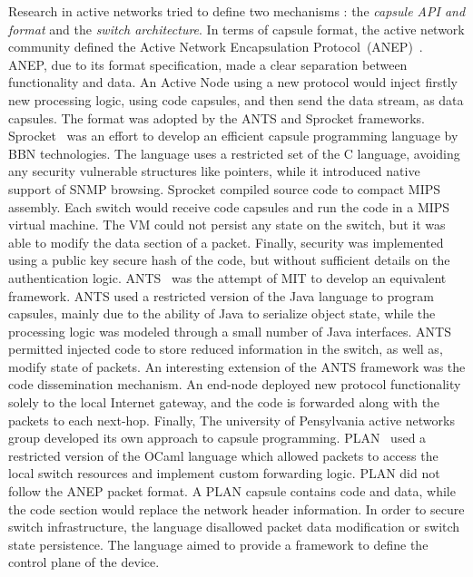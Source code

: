 Research in active networks tried to define two mechanisms : the {\it capsule
  API and format} and the {\it switch architecture}. In terms of capsule
format, the active network community defined the Active Network Encapsulation
Protocol~(ANEP)~\cite{alexander1997a}.  ANEP, due to its format specification,
made a clear separation between functionality and data. An Active Node using a
new protocol would inject firstly new processing logic, using code capsules, and then
send the data stream, as data capsules.  The format was adopted by the ANTS and
Sprocket frameworks.  Sprocket~\cite{Schwartz200} was an effort to develop an
efficient capsule programming language by BBN technologies. The language uses a
restricted set of the C language, avoiding any security vulnerable structures
like pointers, while it introduced native support of SNMP browsing. Sprocket
compiled source code to compact MIPS assembly. Each switch would receive code
capsules and run the code in a MIPS virtual machine. The VM could not persist
any state on the switch, but it was able to modify the data section of a packet.
Finally, security was implemented using a public key secure hash of the code,
but without sufficient details on the authentication logic.
ANTS~\cite{Wetherall1998} was the attempt of MIT to develop an equivalent
framework. ANTS used a restricted version of the Java language to program
capsules, mainly due to the ability of Java to serialize object state, while
the processing logic was modeled through a small number of Java interfaces. ANTS
permitted injected code to store reduced information in the switch, as
well as, modify state of packets. An interesting extension of the ANTS framework
was the code dissemination mechanism. An
end-node deployed new protocol functionality solely to the local Internet
gateway, and the code is forwarded along with the packets to each
next-hop. Finally, The university of Pensylvania active networks group developed
its own approach to capsule programming.  PLAN~\cite{Hicks1998} used a restricted
version of the OCaml language which allowed packets to access the local switch
resources and implement custom forwarding logic. PLAN did not follow the ANEP
packet format. A PLAN capsule contains
code and data, while the code section would replace the network header
information. In order to secure switch infrastructure, the language
disallowed  packet data modification or switch state persistence. The language 
aimed to provide a framework to define the control plane of the device.

